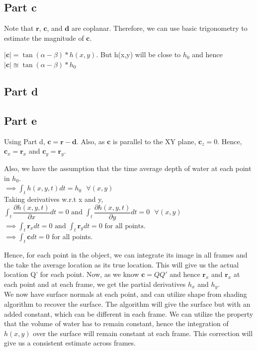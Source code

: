 \documentclass[11pt]{article}
\begin{document}
\subsection*{Part c}
Note that $\mathbf{r}$, $\mathbf{c}$, and $\mathbf{d}$ are coplanar. Therefore, we can use basic trigonometry to estimate the magnitude of $\mathbf{c}$.

$|\mathbf{c}| = \tan(\alpha-\beta) * h(x,y)$. But h(x,y) will be close to $h_{0}$ and hence $|\mathbf{c}| \approxeq \tan(\alpha-\beta) * h_{0}$

\subsection*{Part d}


\subsection*{Part e}
Using Part d, $\mathbf{c} = \mathbf{r} - \mathbf{d}$. Also, as $\mathbf{c}$ is parallel to the XY plane, $\mathbf{c}_{z} = 0$. Hence, $\mathbf{c}_{x} = \mathbf{r}_{x}$ and $\mathbf{c}_{y} = \mathbf{r}_{y}$.

Also, we have the assumption that the time average depth of water at each point in $h_{0}$.\\

$
\implies \int_{t} h(x,y,t) dt = h_{0}   \text{ } \forall (x,y)
$\\
Taking derivatives w.r.t x and y,\\
$
\int_{t} \dfrac{\partial{h(x,y,t)}}{\partial{x}} dt = 0 \text{  and  } \int_{t} \dfrac{\partial{h(x,y,t)}}{\partial{y}} dt = 0   \text{ } \forall (x,y) 
$\\
$
\implies \int_{t} \mathbf{r}_{x} dt = 0 \text{ and } \int_{t} \mathbf{r}_{y} dt = 0 \text{ for all points. }
$\\
$\implies \int_{t} \mathbf{c} dt = 0 $ for all points.

Hence, for each point in the object, we can integrate its image in all frames and the take the average location as its true location. This will give us the actual location Q' for each point. Now, as we know $\mathbf{c} = QQ'$ and hence $\mathbf{r}_{x}$ and $\mathbf{r}_{x}$ at each point and at each frame, we get the partial derivatives $h_{x}$ and $h_{y}$.\\

We now have surface normals at each point, and can utilize shape from shading algorithm to recover the surface. The algorithm will give the surface but with an added constant, which can be different in each frame. We can utilize the property that the volume of water has to remain constant, hence the integration of $h(x,y)$ over the surface will remain constant at each frame. This correction will give us a consistent estimate across frames.
\end{document}
